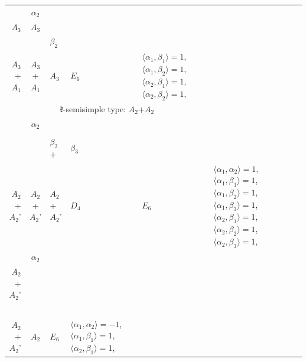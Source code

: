 \documentclass[12pt]{report}
\begin{document}
\begin{appendix}
{\begin{longtable}{rcl p{1cm}p{1cm}p{3cm} }
\\
\begin{tabular}{cc}$\alpha_1$+ & $\alpha_2$\\\tiny{ $A_3$ } & \tiny{ $A_3$ }\end{tabular} &\begin{tabular}{c} = \\~ \end{tabular} & \begin{tabular}{cc}$\beta_1$+ & $\beta_2$\\\tiny{ $A_3$+$A_1$ } & \tiny{ $A_3$+$A_1$ }\end{tabular} & $A_3$ & $E_6$ &  $\langle\alpha_1, \beta_1\rangle=1$, $\langle\alpha_1, \beta_2\rangle=1$, $\langle\alpha_2, \beta_1\rangle=1$, $\langle\alpha_2, \beta_2\rangle=1$, 
\\
\hline\multicolumn{5}{c}{$\mathfrak{k}$-semisimple type: $A_2$+$A_2$}\\
\hline\hline\begin{tabular}{cc}$\alpha_1$+ & $\alpha_2$\\\tiny{  } & \tiny{  }\end{tabular} &\begin{tabular}{c} = \\~ \end{tabular} & \begin{tabular}{ccc}$\beta_1$+ & $\beta_2$+ & $\beta_3$\\\tiny{ $A_2$+$A_2$' } & \tiny{ $A_2$+$A_2$' } & \tiny{ $A_2$+$A_2$' }\end{tabular} & $D_4$ & $E_6$ & $\langle\alpha_1, \alpha_2\rangle=1$,  $\langle\alpha_1, \beta_1\rangle=1$, $\langle\alpha_1, \beta_2\rangle=1$, $\langle\alpha_1, \beta_3\rangle=1$, $\langle\alpha_2, \beta_1\rangle=1$, $\langle\alpha_2, \beta_2\rangle=1$, $\langle\alpha_2, \beta_3\rangle=1$, 
\\
\begin{tabular}{cc}$\alpha_1$+ & $\alpha_2$\\\tiny{ $A_2$+$A_2$' } & \tiny{  }\end{tabular} &\begin{tabular}{c} = \\~ \end{tabular} & \begin{tabular}{c}$\beta_1$\\\tiny{ $A_2$+$A_2$' }\end{tabular} & $A_2$ & $E_6$ & $\langle\alpha_1, \alpha_2\rangle=-1$,  $\langle\alpha_1, \beta_1\rangle=1$, $\langle\alpha_2, \beta_1\rangle=1$, 

\end{longtable}}
\end{appendix}
\end{document}
